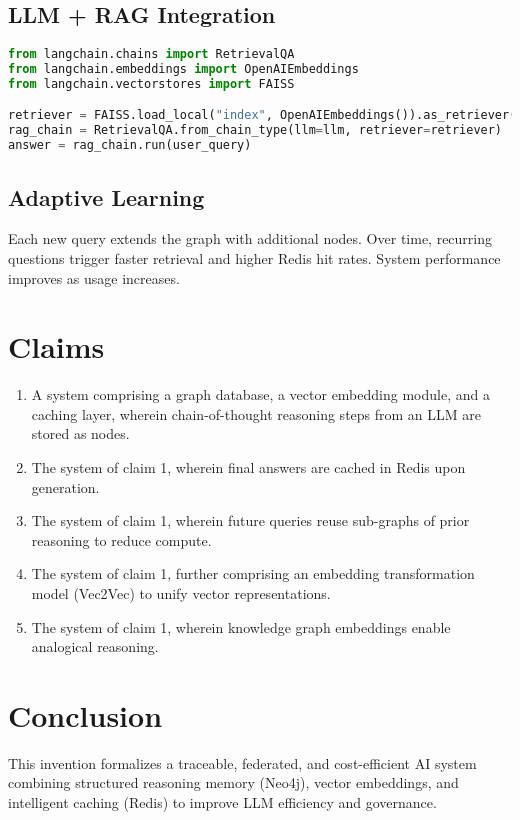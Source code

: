 \documentclass[12pt]{article}
\begin{document}
\subsection*{LLM + RAG Integration}
\begin{lstlisting}[language=Python, caption=LangChain-style LLM fallback with RAG]
from langchain.chains import RetrievalQA
from langchain.embeddings import OpenAIEmbeddings
from langchain.vectorstores import FAISS

retriever = FAISS.load_local("index", OpenAIEmbeddings()).as_retriever()
rag_chain = RetrievalQA.from_chain_type(llm=llm, retriever=retriever)
answer = rag_chain.run(user_query)
\end{lstlisting}

\subsection*{Adaptive Learning}
Each new query extends the graph with additional nodes. Over time, recurring questions trigger faster retrieval and higher Redis hit rates. System performance improves as usage increases.

\section*{Claims}
\begin{enumerate}[label=\arabic*.]
  \item A system comprising a graph database, a vector embedding module, and a caching layer, wherein chain-of-thought reasoning steps from an LLM are stored as nodes.
  \item The system of claim 1, wherein final answers are cached in Redis upon generation.
  \item The system of claim 1, wherein future queries reuse sub-graphs of prior reasoning to reduce compute.
  \item The system of claim 1, further comprising an embedding transformation model (Vec2Vec) to unify vector representations.
  \item The system of claim 1, wherein knowledge graph embeddings enable analogical reasoning.
\end{enumerate}

\section*{Conclusion}
This invention formalizes a traceable, federated, and cost-efficient AI system combining structured reasoning memory (Neo4j), vector embeddings, and intelligent caching (Redis) to improve LLM efficiency and governance.
\end{document}

